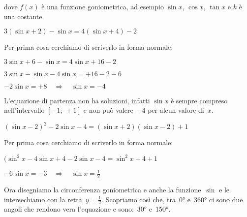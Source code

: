 dove \(f(x)\) è una funzione goniometrica, ad esempio \(\sin x\), \(\cos x\), 
\(\tan x\) e \(k\) è una costante.

 \begin{esempio}
  \(3(\sin x +2) - \sin x = 4 (\sin x +4)-2\)
  
  Per prima cosa cerchiamo di scriverlo in forma normale:
  
  \(3 \sin x +6 - \sin x = 4 \sin x +16-2\)
  
  \(3 \sin x - \sin x - 4 \sin x = +16-2-6 \)
  
  \(- 2 \sin x = +8 \quad \Rightarrow \quad \sin x = -4 \)
  
  L'equazione di partenza non ha soluzioni, infatti \(\sin x\) è sempre 
compreso 
  nell'intervallo \(\left [-1;~+1 \right]\) e non può valere~\(-4\) per alcun 
  valore di~\(x\).
 \end{esempio}

 \begin{esempio}
  \((\sin x -2)^2 - 2 \sin x -4 = (\sin x +2)(\sin x -2)+1\)
  
  Per prima cosa cerchiamo di scriverlo in forma normale:
  
  \((\sin^2 x -4 \sin x +4 - 2 \sin x -4 = \sin^2x -4 +1\)
  
  \(-6 \sin x = -3 \quad \Rightarrow \quad \sin x = \frac{1}{2}\)
  
 \vspace{-6pt}
  \begin{center}
\begin{inaccessibleblock}[Soluzione grafica dell'equazione: 
    \(\sin x = \frac{1}{2}\).]
    
\end{inaccessibleblock}
  \end{center}

  Ora disegniamo la circonferenza goniometrica e anche la funzione~\(\sin\) 
  e le intersechiamo con la retta~\(y=\frac{1}{2}\).
  Scopriamo così che, tra~0° e~360° ci sono due angoli che rendono vera 
  l'equazione e sono:~30° e~150°. 
 \end{esempio}

